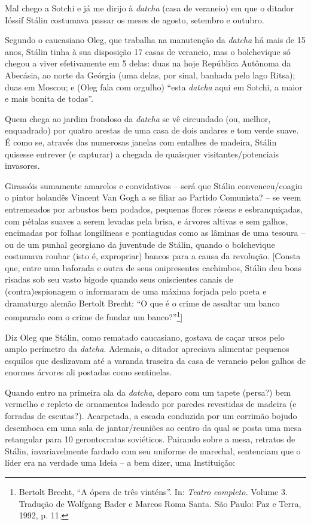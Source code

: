 Mal chego a Sotchi e já me dirijo à \emph{datcha} (casa de veraneio) em
que o ditador Ióssif Stálin costumava passar os meses de agosto,
setembro e outubro.

Segundo o caucasiano Oleg, que trabalha na manutenção da \emph{datcha}
há mais de 15 anos, Stálin tinha à sua disposição 17 casas de veraneio,
mas o bolchevique só chegou a viver efetivamente em 5 delas: duas na
hoje República Autônoma da Abecásia, ao norte da Geórgia (uma delas, por
sinal, banhada pelo lago Ritsa); duas em Moscou; e (Oleg fala com
orgulho) ``esta \emph{datcha} aqui em Sotchi, a maior e mais bonita de
todas''.

Quem chega ao jardim frondoso da \emph{datcha} se vê circundado (ou,
melhor, enquadrado) por quatro arestas de uma casa de dois andares e tom
verde suave. É como se, através das numerosas janelas com entalhes de
madeira, Stálin quisesse entrever (e capturar) a chegada de quaisquer
visitantes/potenciais invasores.

Girassóis sumamente amarelos e convidativos -- será que Stálin
convenceu/coagiu o pintor holandês Vincent Van Gogh a se filiar ao
Partido Comunista? -- se veem entremeados por arbustos bem podados,
pequenas flores róseas e esbranquiçadas, com pétalas suaves a serem
levadas pela brisa, e árvores altivas e sem galhos, encimadas por folhas
longilíneas e pontiagudas como as lâminas de uma tesoura -- ou de um
punhal georgiano da juventude de Stálin, quando o bolchevique costumava
roubar (isto é, expropriar) bancos para a causa da revolução. {[}Consta
que, entre uma baforada e outra de seus onipresentes cachimbos, Stálin
deu boas risadas sob seu vasto bigode quando seus oniscientes canais de
(contra)espionagem o informaram de uma máxima forjada pelo poeta e
dramaturgo alemão Bertolt Brecht: ``O que é o crime de assaltar um banco
comparado com o crime de fundar um banco?''\footnote{Bertolt Brecht, ``A
  ópera de três vinténs''. In: \emph{Teatro completo.} Volume 3.
  Tradução de Wolfgang Bader e Marcos Roma Santa. São Paulo: Paz e
  Terra, 1992, p. 11.}{]}

Diz Oleg que Stálin, como rematado caucasiano, gostava de caçar ursos
pelo amplo perímetro da \emph{datcha}. Ademais, o ditador apreciava
alimentar pequenos esquilos que deslizavam até a varanda traseira da
casa de veraneio pelos galhos de enormes árvores ali postadas como
sentinelas.

Quando entro na primeira ala da \emph{datcha}, deparo com um tapete
(persa?) bem vermelho e repleto de ornamentos ladeado por paredes
revestidas de madeira (e forradas de escutas?). Acarpetada, a escada
conduzida por um corrimão bojudo desemboca em uma sala de
jantar/reuniões ao centro da qual se posta uma mesa retangular para 10
gerontocratas soviéticos. Pairando sobre a mesa, retratos de Stálin,
invariavelmente fardado com seu uniforme de marechal, sentenciam que o
líder era na verdade uma Ideia -- a bem dizer, uma Instituição:

